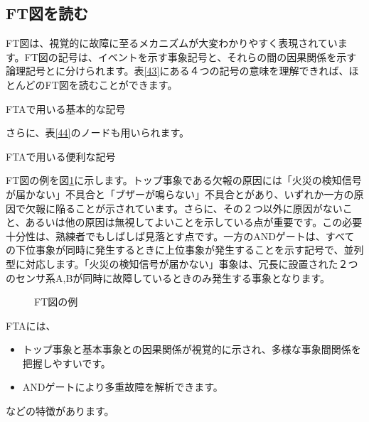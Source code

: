 \subsection{FT図を読む}
FT図は、視覚的に故障に至るメカニズムが大変わかりやすく表現されています。FT図の記号は、イベントを示す事象記号と、それらの間の因果関係を示す論理記号とに分けられます。表\ref{43}にある４つの記号の意味を理解できれば、ほとんどのFT図を読むことができます。
\begin{table}[htbp]
\caption{FTAで用いる基本的な記号}
\begin{center}
\end{center}
\label{43}
\end{table}
さらに、表\ref{44}のノードも用いられます。
\begin{table}[htbp]
\caption{FTAで用いる便利な記号}
\begin{center}
\end{center}
\label{44}
\end{table}
FT図の例を図\ref{415}に示します。トップ事象である欠報の原因には「火災の検知信号が届かない」不具合と「ブザーが鳴らない」不具合とがあり、いずれか一方の原因で欠報に陥ることが示されています。さらに、その２つ以外に原因がないこと、あるいは他の原因は無視してよいことを示している点が重要です。この必要十分性は、熟練者でもしばしば見落とす点です。一方のANDゲートは、すべての下位事象が同時に発生するときに上位事象が発生することを示す記号で、並列型に対応します。「火災の検知信号が届かない」事象は、冗長に設置された２つのセンサ系A,Bが同時に故障しているときのみ発生する事象となります。
\begin{figure}[htbp]
\begin{center}
\end{center}
\caption{FT図の例}
\label{415}
\end{figure}
FTAには、
\begin{itemize}
\item トップ事象と基本事象との因果関係が視覚的に示され、多様な事象間関係を把握しやすいです。
\item ANDゲートにより多重故障を解析できます。
\end{itemize}
などの特徴があります。
